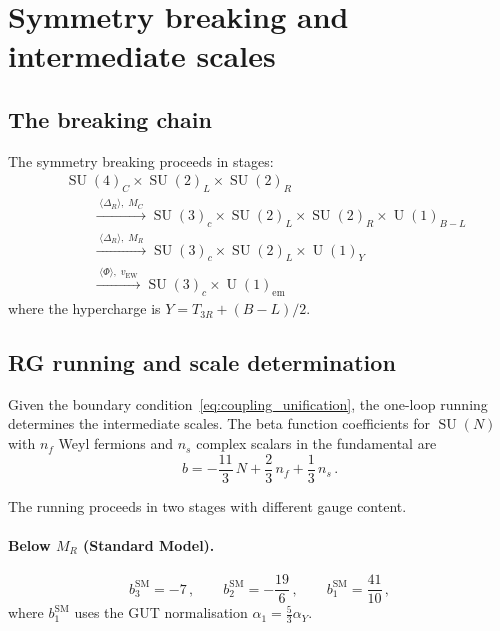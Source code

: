 \documentclass[12pt,a4paper]{article}
\theoremstyle{definition}
\newcommand{\SU}{\operatorname{SU}}
\newcommand{\U}{\operatorname{U}}
\begin{document}
\section{Symmetry breaking and intermediate scales}
\label{sec:breaking}

\subsection{The breaking chain}

The symmetry breaking proceeds in stages:
\begin{equation}
\label{eq:breaking_chain}
\begin{aligned}
&\SU(4)_C \times \SU(2)_L \times \SU(2)_R \\
&\qquad \xrightarrow{\;\langle\Delta_R\rangle,\; M_C\;} \SU(3)_c \times \SU(2)_L \times \SU(2)_R \times \U(1)_{B-L} \\
&\qquad \xrightarrow{\;\langle\Delta_R\rangle,\; M_R\;} \SU(3)_c \times \SU(2)_L \times \U(1)_Y \\
&\qquad \xrightarrow{\;\langle\Phi\rangle,\; v_{\mathrm{EW}}\;} \SU(3)_c \times \U(1)_{\mathrm{em}}
\end{aligned}
\end{equation}
where the hypercharge is $Y = T_{3R} + (B{-}L)/2$.

\subsection{RG running and scale determination}

Given the boundary condition~\eqref{eq:coupling_unification}, the one-loop running determines the intermediate scales.
The beta function coefficients for $\SU(N)$ with $n_f$ Weyl fermions and $n_s$ complex scalars in the fundamental are
\begin{equation}
b = -\frac{11}{3}\, N + \frac{2}{3}\, n_f + \frac{1}{3}\, n_s\,.
\end{equation}

The running proceeds in two stages with different gauge content.

\paragraph{Below $M_R$ (Standard Model).}
\begin{equation}
b_3^{\mathrm{SM}} = -7\,, \qquad b_2^{\mathrm{SM}} = -\frac{19}{6}\,, \qquad b_{1}^{\mathrm{SM}} = \frac{41}{10}\,,
\end{equation}
where $b_1^{\mathrm{SM}}$ uses the GUT normalisation $\alpha_1 = \tfrac{5}{3}\alpha_Y$.
\end{document}
